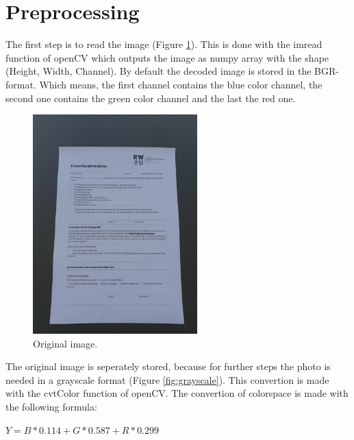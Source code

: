 \documentclass[twocolumn,10pt]{asme2ej}
\begin{document}
\section{Preprocessing}
\label{section:preprocessing}

The first step is to read the image (Figure \ref{fig:orginial}). This is done with the imread function of openCV which 
outputs the image as numpy array with the shape (Height, Width, Channel).
By default the decoded image is stored in the BGR-format. Which means, the first channel contains the
blue color channel, the second one contains the green color channel and the last the red one.
\begin{figure}[H]
    \centerline{\includegraphics[width=2.5in]{output/hoch_3_1_original.jpg}}
    \caption{Original image.}
    \label{fig:orginial}
\end{figure}
The original image is seperately stored, because for further steps the photo is needed in a grayscale format (Figure \ref{fig:grayscale}).
This convertion is made with the cvtColor\cite{opencv_cvtColor} function of openCV. The convertion of colorspace is made with the following
formula\cite{opencv_rgb2gray}:
\begin{center}
    $Y = B * 0.114 + G * 0.587 + R * 0.299$
    \label{eq_rgb2gray}
\end{center}
\end{document}

